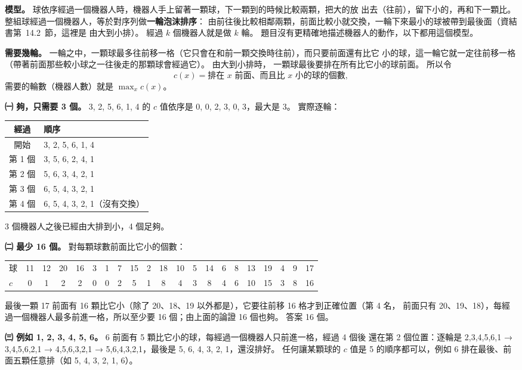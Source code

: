 \begin{pastsoln}
\textbf{模型。} 球依序經過一個機器人時，機器人手上留著一顆球，下一顆到的時候比較兩顆，把大的放
出去（往前），留下小的，再和下一顆比。 整組球經過一個機器人，等於對序列做\textbf{一輪泡沫排序}：
由前往後比較相鄰兩顆，前面比較小就交換，一輪下來最小的球被帶到最後面（資結書第~14.2~節，這裡是
由大到小排）。 經過 $k$ 個機器人就是做 $k$ 輪。 題目沒有更精確地描述機器人的動作，以下都用這個模型。

\textbf{需要幾輪。} 一輪之中，一顆球最多往前移一格（它只會在和前一顆交換時往前），而只要前面還有比它
小的球，這一輪它就一定往前移一格（帶著前面那些較小球之一往後走的那顆球會經過它）。 由大到小排時，
一顆球最後要排在所有比它小的球前面。 所以令
\[
c(x) = \text{排在 } x \text{ 前面、而且比 } x \text{ 小的球的個數},
\]
需要的輪數（機器人數）就是 $\max_x c(x)$。

\textbf{㈠ 夠，只需要 3 個。} 3, 2, 5, 6, 1, 4 的 $c$ 值依序是 0, 0, 2, 3, 0, 3，最大是 3。 實際逐輪：
\begin{center}
\begin{tabular}{cl}
\toprule
經過 & 順序 \\
\midrule
開始 & 3, 2, 5, 6, 1, 4 \\
第 1 個 & 3, 5, 6, 2, 4, 1 \\
第 2 個 & 5, 6, 3, 4, 2, 1 \\
第 3 個 & 6, 5, 4, 3, 2, 1 \\
第 4 個 & 6, 5, 4, 3, 2, 1（沒有交換） \\
\bottomrule
\end{tabular}
\end{center}
3 個機器人之後已經由大排到小，4 個足夠。

\textbf{㈡ 最少 16 個。} 對每顆球數前面比它小的個數：
\begin{center}
\small
\begin{tabular}{l*{20}{c}}
\toprule
球 & 11 & 12 & 20 & 16 & 3 & 1 & 7 & 15 & 2 & 18 & 10 & 5 & 14 & 6 & 8 & 13 & 19 & 4 & 9 & 17 \\
$c$ & 0 & 1 & 2 & 2 & 0 & 0 & 2 & 5 & 1 & 8 & 4 & 3 & 8 & 4 & 6 & 10 & 15 & 3 & 8 & 16 \\
\bottomrule
\end{tabular}
\end{center}
最後一顆 17 前面有 16 顆比它小（除了 20、18、19 以外都是），它要往前移 16 格才到正確位置（第 4 名，
前面只有 20、19、18），每經過一個機器人最多前進一格，所以至少要 16 個；由上面的論證 16 個也夠。
答案 16 個。

\textbf{㈢ 例如 1, 2, 3, 4, 5, 6。} 6 前面有 5 顆比它小的球，每經過一個機器人只前進一格，經過 4 個後
還在第 2 個位置：逐輪是 2,3,4,5,6,1 → 3,4,5,6,2,1 → 4,5,6,3,2,1 → 5,6,4,3,2,1，最後是
5, 6, 4, 3, 2, 1，還沒排好。 任何讓某顆球的 $c$ 值是 5 的順序都可以，例如 6 排在最後、前面五顆任意排（如 5, 4, 3, 2, 1, 6）。


\end{pastsoln}
